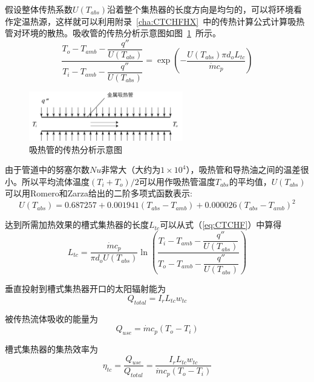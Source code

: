 假设整体传热系数$U(T_{abs})$沿着整个集热器的长度方向是均匀的，可以将环境看作定温热源，这样就可以利用附录~\ref{cha:CTCHFHX}~中的传热计算公式计算吸热管对环境的散热。吸收管的传热分析示意图如图~\ref{fig:Pipe}~所示。
\begin{equation}
	\frac{T_{o}-T_{amb}-\dfrac{q''}{U(T_{abs})}}{T_{i}-T_{amb}-\dfrac{q''}{U(T_{abs})}}=\exp(-\frac{U(T_{abs})\pi d_o L_{tc}}{\dot{m}c_{p}})\label{eq:CTCHF}
\end{equation}

\begin{figure}[!ht]
\centering
\includegraphics[width=0.6\textwidth]{fig/Pipe.pdf}
\caption{吸热管的传热分析示意图}\label{fig:Pipe}
\end{figure}

由于管道中的努塞尔数$Nu$非常大（大约为$1\times10^4$），吸热管和导热油之间的温差很小。所以平均流体温度$(T_{i}+T_{o})/2$可以用作吸热管温度$T_{abs}$的平均值，$U(T_{abs})$可以用Romero和Zarza给出的二阶多项式函数表示\cite{Romero2007}:
\begin{equation}
	U(T_{abs}) = 0.687257 + 0.001941(T_{abs} - T_{amb}) + 0.000026(T_{abs} - T_{amb})^2
\end{equation}

达到所需加热效果的槽式集热器的长度$L_{tc}$可以从式（\ref{eq:CTCHF}）中算得
\begin{equation}
	L_{tc} = \dfrac{\dot{m}c_p}{\pi d_o U(T_{abs})}\ln\left(\dfrac{T_i-T_{amb}-\dfrac{q''}{U(T_{abs})}}{T_o-T_{amb}-\dfrac{q''}{U(T_{abs})}}\right)
	\label{eq:get_L}
\end{equation}

垂直投射到槽式集热器开口的太阳辐射能为
\begin{equation}
  Q_{total} = I_r L_{tc} w_{tc}
\end{equation}

被传热流体吸收的能量为
\begin{equation}
  Q_{use} = \dot{m}c_p(T_o - T_i)
\end{equation}

槽式集热器的集热效率为
\begin{equation}
  \eta_{tc} = \dfrac{Q_{use}}{Q_{total}} = 
  \dfrac{I_r L_{tc} w_{tc}}{\dot{m}c_p(T_o - T_i)}
  \label{eq:eta_tc}
\end{equation}


